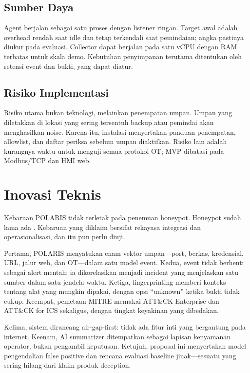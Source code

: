 \documentclass[12pt,a4paper]{article}
\begin{document}
\subsection{Sumber Daya}

Agent berjalan sebagai satu proses dengan listener ringan. Target awal adalah overhead rendah saat idle dan tetap terkendali saat pemindaian; angka pastinya diukur pada evaluasi. Collector dapat berjalan pada satu vCPU dengan RAM terbatas untuk skala demo. Kebutuhan penyimpanan terutama ditentukan oleh retensi event dan bukti, yang dapat diatur.

\subsection{Risiko Implementasi}

Risiko utama bukan teknologi, melainkan penempatan umpan. Umpan yang diletakkan di lokasi yang sering tersentuh backup atau pemindai akan menghasilkan noise. Karena itu, instalasi menyertakan panduan penempatan, allowlist, dan daftar periksa sebelum umpan diaktifkan. Risiko lain adalah kurangnya waktu untuk menguji semua protokol OT; MVP dibatasi pada Modbus/TCP dan HMI web.

\section{Inovasi Teknis}

Kebaruan POLARIS tidak terletak pada penemuan honeypot. Honeypot sudah lama ada \citep{spitzner2002,provos2007}. Kebaruan yang diklaim bersifat rekayasa integrasi dan operasionalisasi, dan itu pun perlu diuji.

Pertama, POLARIS menyatukan enam vektor umpan---port, berkas, kredensial, URL, jalur web, dan OT---dalam satu model event. Kedua, event tidak berhenti sebagai alert mentah; ia dikorelasikan menjadi incident yang menjelaskan satu sumber dalam satu jendela waktu. Ketiga, fingerprinting memberi konteks tentang alat yang mungkin dipakai, dengan opsi ``unknown'' ketika bukti tidak cukup. Keempat, pemetaan MITRE memakai ATT\&CK Enterprise dan ATT\&CK for ICS sekaligus, dengan tingkat keyakinan yang dibedakan.

Kelima, sistem dirancang air-gap-first: tidak ada fitur inti yang bergantung pada internet. Keenam, AI summarizer ditempatkan sebagai lapisan kenyamanan operator, bukan pengambil keputusan. Ketujuh, proposal ini menyertakan model pengendalian false positive dan rencana evaluasi baseline jinak---sesuatu yang sering hilang dari klaim produk deception.
\end{document}
